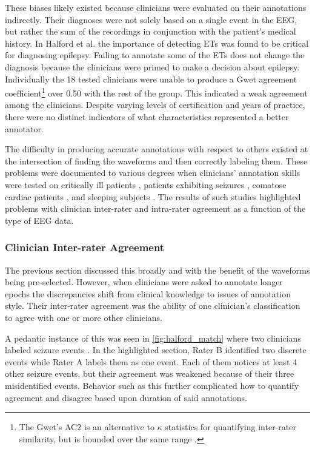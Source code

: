These biases likely existed because clinicians were evaluated on their annotations indirectly. Their diagnoses were not solely based on a single event in the \ac{EEG}, but rather the sum of the recordings in conjunction with the patient's medical history. In Halford et al. \cite{Halford2017} the importance of detecting \acp{ET} was found to be critical for diagnosing epilepsy. Failing to annotate some of the \acp{ET} does not change the diagnosis because the clinicians were primed to make a decision about epilepsy. Individually the 18 tested clinicians were unable to produce a Gwet agreement coefficient\footnote{The Gwet's AC2 is an alternative to $\kappa$ statistics for quantifying inter-rater similarity, but is bounded over the same range \cite{Gwet2012}.} over 0.50 with the rest of the group. This indicated a weak agreement among the clinicians. Despite varying levels of certification and years of practice, there were no distinct indicators of what characteristics represented a better annotator.

The difficulty in producing accurate annotations with respect to others existed at the intersection of finding the waveforms and then correctly labeling them. These problems were documented to various degrees when clinicians' annotation skills were tested on critically ill patients \cite{Gerber2008}, patients exhibiting seizures \cite{Grant2014, Halford2015}, comatose cardiac patients \cite{Westhall2015}, and sleeping subjects \cite{Silber2007}. The results of such studies highlighted problems with clinician inter-rater and intra-rater agreement as a function of the type of \ac{EEG} data.

\subsubsection{Clinician Inter-rater Agreement}

The previous section discussed this broadly and with the benefit of the waveforms being pre-selected. However, when clinicians were asked to annotate longer epochs the discrepancies shift from clinical knowledge to issues of annotation style. Their inter-rater agreement was the ability of one clinician's classification to agree with one or more other clinicians.

A pedantic instance of this was seen in \cref{fig:halford_match} where two clinicians labeled seizure events \cite{Halford2015}. In the highlighted section, Rater B identified two discrete events while Rater A labels them as one event. Each of them notices at least 4 other seizure events, but their agreement was weakened because of their three misidentified events. Behavior such as this further complicated how to quantify agreement and disagree based upon duration of said annotations.

